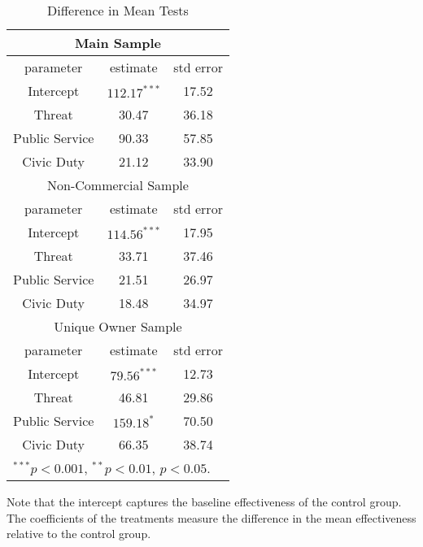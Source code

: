 \documentclass[12pt,titlepage]{article}
\begin{document}
\begin{table}[htbp]
\caption{Difference in Mean Tests}\label{dif_mean}
\begin{center}
\begin{tabular}{|c|c|c|}
\hline
\multicolumn{3}{|c|}{Main Sample} \\
\hline
parameter & estimate & std error \\
\hline
Intercept&  $112.17^{***}$ & 17.52 \\
Threat & 30.47  & 36.18 \\
Public Service & 90.33 & 57.85 \\ 
Civic Duty& 21.12 & 33.90 \\
\hline
\multicolumn{3}{|c|}{Non-Commercial Sample} \\
\hline
parameter & estimate & std error \\
\hline
Intercept & $114.56^{***}$ & 17.95 \\
Threat & 33.71 &  37.46 \\
Public Service & 21.51 &  26.97 \\
Civic Duty & 18.48 & 34.97 \\
\hline
\multicolumn{3}{|c|}{Unique Owner Sample} \\
\hline
parameter & estimate & std error \\
\hline
Intercept &  $79.56^{***}$ &  12.73  \\
Threat & 46.81 &  29.86 \\ 
Public Service & $159.18^{*}$ & 70.50 \\ 
Civic  Duty & 66.35 &  38.74 \\
\hline
\multicolumn{3}{|l|}{$^{***}p<0.001$, $^{**}p<0.01$,  $p<0.05$.} \\

\hline
\end{tabular}
\end{center}
Note that the intercept captures the baseline effectiveness of the control group. The coefficients of the treatments measure the difference in the mean effectiveness relative to the control group.
\end{table}
\end{document}
